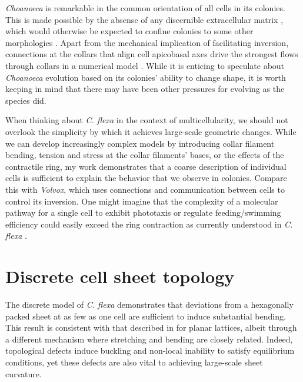 \textit{Choanoeca} is remarkable in the common orientation of all cells in its colonies. 
This is made possible by the absense of any discernible extracellular matrix \citep{leadbeater1983,brunet2019}, which would otherwise be expected to confine colonies to some other morphologies \citep{larson2020}. 
Apart from the mechanical implication of facilitating inversion, connections at the collars that align cell apicobasal axes drive the strongest flows through collars in a numerical model \citep{kirkegaard2016}. 
While it is enticing to speculate about \textit{Choanoeca} evolution based on its colonies' ability to change shape, it is worth keeping in mind that there may have been other pressures for evolving as the species did.

When thinking about \textit{C. flexa} in the context of multicellularity, we should not overlook the simplicity by which it achieves large-scale geometric changes. 
While we can develop increasingly complex models by introducing collar filament bending, tension and stress at the collar filaments' bases, or the effects of the contractile ring, my work demonstrates that a coarse description of individual cells is sufficient to explain the behavior that we observe in colonies. 
Compare this with \textit{Volvox}, which uses connections and communication between cells to control its inversion. 
One might imagine that the complexity of a molecular pathway for a single cell to exhibit phototaxis or regulate feeding/swimming efficiency could easily exceed the ring contraction as currently understood in \textit{C. flexa} \citep{brunet2019}. 

\section{Discrete cell sheet topology}

The discrete model of \textit{C. flexa} demonstrates that deviations from a hexagonally packed sheet at as few as one cell are sufficient to induce substantial bending.
This result is consistent with that described in \citet{seung1988} for planar lattices, albeit through a different mechanism where stretching and bending are closely related.
Indeed, topological defects induce buckling and non-local inability to satisfy equilibrium conditions, yet these defects are also vital to achieving large-scale sheet curvature.

